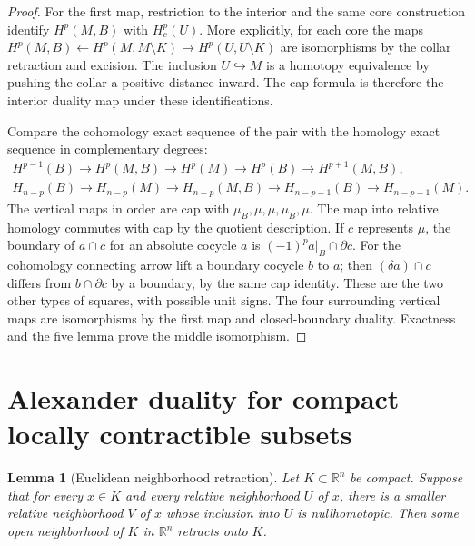 \documentclass[11pt,oneside,openany]{book}
\theoremstyle{plain}
\newtheorem{lemma}[theorem]{Lemma}
\theoremstyle{definition}
\theoremstyle{remark}
\newcommand{\R}{\mathbb R}
\begin{document}
\begin{proof}
For the first map, restriction to the interior and the
same core construction identify \(H^p(M,B)\) with
\(H_c^p(U)\). More explicitly, for each core the maps
\(H^p(M,B)\leftarrow H^p(M,M\setminus K)\to
H^p(U,U\setminus K)\) are isomorphisms by the collar
retraction and excision. The inclusion \(U\hookrightarrow M\)
is a homotopy equivalence by pushing the collar a
positive distance inward. The cap formula is therefore
the interior duality map under these identifications.

Compare the cohomology exact sequence of the pair with
the homology exact sequence in complementary degrees:
\[
\begin{gathered}
 H^{p-1}(B)\longrightarrow H^p(M,B)\longrightarrow H^p(M)
 \longrightarrow H^p(B)\longrightarrow H^{p+1}(M,B),\\
 H_{n-p}(B)\longrightarrow H_{n-p}(M)\longrightarrow H_{n-p}(M,B)
 \longrightarrow H_{n-p-1}(B)\longrightarrow H_{n-p-1}(M).
\end{gathered}
\]
The vertical maps in order are cap with \(\mu_B,\mu,\mu,\mu_B,\mu\).
The map into relative homology commutes with cap by the quotient
description. If \(c\) represents \(\mu\), the boundary
of \(a\cap c\) for an absolute cocycle \(a\) is
\((-1)^p a|_B\cap\partial c\). For the cohomology
connecting arrow lift a boundary cocycle \(b\) to \(a\);
then \((\delta a)\cap c\) differs from
\(b\cap\partial c\) by a boundary, by the same cap identity.
These are the two other types of squares, with possible
unit signs. The four surrounding vertical maps are
isomorphisms by the first map and closed-boundary duality.
Exactness and the five lemma prove the middle isomorphism.
\end{proof}

\section{Alexander duality for compact locally contractible subsets}
\label{p202:T32}

\begin{lemma}[Euclidean neighborhood retraction]\label{lem:p202-enr}
Let \(K\subset\R^n\) be compact. Suppose that for every \(x\in K\)
and every relative neighborhood \(U\) of \(x\), there is a smaller
relative neighborhood \(V\) of \(x\) whose inclusion into \(U\)
is nullhomotopic. Then some open neighborhood of \(K\) in
\(\R^n\) retracts onto \(K\).
\end{lemma}
\end{document}
